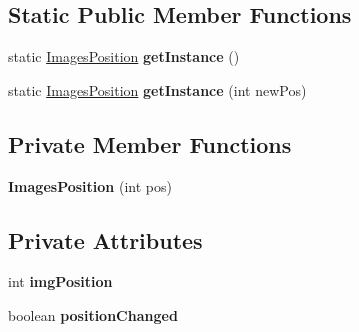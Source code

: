 \subsection*{Static Public Member Functions}
\begin{DoxyCompactItemize}
\item 
static \hyperlink{classcom_1_1example_1_1sebastian_1_1tindertp_1_1commonTools_1_1ImagesPosition}{Images\+Position} {\bfseries get\+Instance} ()\hypertarget{classcom_1_1example_1_1sebastian_1_1tindertp_1_1commonTools_1_1ImagesPosition_a66cd0a56da6efdecfac30ccc3555d0be}{}\label{classcom_1_1example_1_1sebastian_1_1tindertp_1_1commonTools_1_1ImagesPosition_a66cd0a56da6efdecfac30ccc3555d0be}

\item 
static \hyperlink{classcom_1_1example_1_1sebastian_1_1tindertp_1_1commonTools_1_1ImagesPosition}{Images\+Position} {\bfseries get\+Instance} (int new\+Pos)\hypertarget{classcom_1_1example_1_1sebastian_1_1tindertp_1_1commonTools_1_1ImagesPosition_ae82ae457e6b02aef17efea041547624d}{}\label{classcom_1_1example_1_1sebastian_1_1tindertp_1_1commonTools_1_1ImagesPosition_ae82ae457e6b02aef17efea041547624d}

\end{DoxyCompactItemize}
\subsection*{Private Member Functions}
\begin{DoxyCompactItemize}
\item 
{\bfseries Images\+Position} (int pos)\hypertarget{classcom_1_1example_1_1sebastian_1_1tindertp_1_1commonTools_1_1ImagesPosition_a8476afabf848426ac5414362c754b59d}{}\label{classcom_1_1example_1_1sebastian_1_1tindertp_1_1commonTools_1_1ImagesPosition_a8476afabf848426ac5414362c754b59d}

\end{DoxyCompactItemize}
\subsection*{Private Attributes}
\begin{DoxyCompactItemize}
\item 
int {\bfseries img\+Position}\hypertarget{classcom_1_1example_1_1sebastian_1_1tindertp_1_1commonTools_1_1ImagesPosition_a009f161867f4f1e53541ca4363ecd92c}{}\label{classcom_1_1example_1_1sebastian_1_1tindertp_1_1commonTools_1_1ImagesPosition_a009f161867f4f1e53541ca4363ecd92c}

\item 
boolean {\bfseries position\+Changed}\hypertarget{classcom_1_1example_1_1sebastian_1_1tindertp_1_1commonTools_1_1ImagesPosition_aa9eb19a3432d5244e936dbd6a5da4904}{}\label{classcom_1_1example_1_1sebastian_1_1tindertp_1_1commonTools_1_1ImagesPosition_aa9eb19a3432d5244e936dbd6a5da4904}

\end{DoxyCompactItemize}
